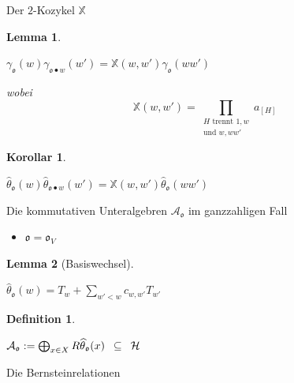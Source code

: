 \documentclass[pdf]{beamer}
\newcommand{\bbf}[1]{\mathds{#1}}
\newcommand{\X}{\bbf{X}}
\newtheorem*{cor*}{Korollar}
\newtheorem*{lemma*}{Lemma}
\newtheorem*{def*}{Definition}
\begin{document}
\begin{frame}{Der $2$-Kozykel $\X$}
   \pause \begin{lemma*}
      \begin{center}$\gamma_\mathfrak{o}(w)\gamma_{\mathfrak{o}\bullet w}(w') = \X(w,w') \gamma_\mathfrak{o}(ww')$\end{center}
      wobei
      \[ \X(w,w') = \prod_{\substack{ \text{$H$ trennt $1, w$} \\ \text{und $w, ww'$}}} a_{[H]} \]
   \end{lemma*}
   \pause \begin{cor*}
      \begin{center}$\widehat{\theta}_{\mathfrak{o}}(w)\widehat{\theta}_{\mathfrak{o}\bullet{}w}(w') = \X(w,w') \widehat{\theta}_{\mathfrak{o}}(ww')$\end{center}
   \end{cor*}
\end{frame}

\begin{frame}{Die kommutativen Unteralgebren $\mathcal{A}_{\mathfrak{o}}$ im ganzzahligen Fall}
   \begin{itemize}
      \item $\mathfrak{o} = \mathfrak{o}_V$
   \end{itemize}
   \pause \begin{lemma*}[Basiswechsel]
      \begin{center}$\widehat{\theta}_{\mathfrak{o}}(w) = T_w + \sum_{w' < w} c_{w,w'} T_{w'}$\end{center}
   \end{lemma*}
   \pause \begin{def*}
      \begin{center}$\mathcal{A}_\mathfrak{o} := \bigoplus_{x \in X} R\widehat{\theta}_{\mathfrak{o}}(x) \enskip \subseteq \enskip \mathcal{H}$\end{center}
   \end{def*}
\end{frame}

\begin{frame}{Die Bernsteinrelationen}

\end{frame}
\end{document}
